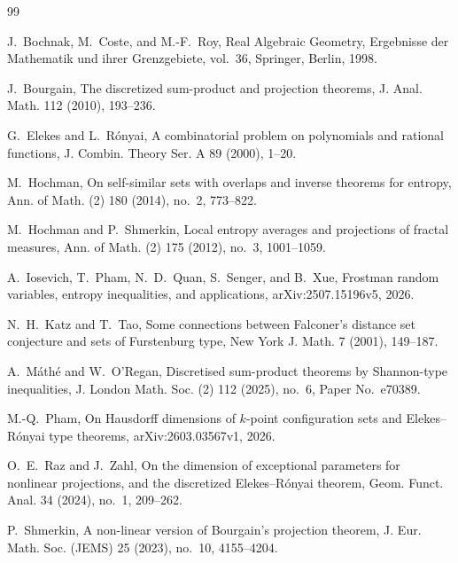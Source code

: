\documentclass[11pt]{article}
\begin{document}
\begin{thebibliography}{99}

J.~Bochnak, M.~Coste, and M.-F.~Roy,
Real Algebraic Geometry,
Ergebnisse der Mathematik und ihrer Grenzgebiete, vol.~36,
Springer, Berlin, 1998.

{
J.~Bourgain,
The discretized sum-product and projection theorems,
J. Anal. Math. 112 (2010), 193--236.}

G.~Elekes and L.~R\'onyai,
A combinatorial problem on polynomials and rational functions,
J. Combin. Theory Ser. A 89 (2000), 1--20.

{
M.~Hochman,
On self-similar sets with overlaps and inverse theorems for
entropy,
Ann. of Math. (2) 180 (2014), no.~2, 773--822.}

{
M.~Hochman and P.~Shmerkin,
Local entropy averages and projections of fractal measures,
Ann. of Math. (2) 175 (2012), no.~3, 1001--1059.}

A.~Iosevich, T.~Pham, N.~D.~Quan, S.~Senger, and B.~Xue,
Frostman random variables, entropy inequalities, and applications,
arXiv:2507.15196v5, 2026.

{
N.~H.~Katz and T.~Tao,
Some connections between Falconer's distance set conjecture and
sets of Furstenburg type,
New York J. Math. 7 (2001), 149--187.}

{
A.~M\'ath\'e and W.~O'Regan,
Discretised sum-product theorems by Shannon-type inequalities,
J. London Math. Soc. (2) 112 (2025), no.~6,
Paper No.~e70389.}

M.-Q.~Pham,
On Hausdorff dimensions of $k$-point configuration sets and
Elekes--R\'onyai type theorems,
arXiv:2603.03567v1, 2026.

O.~E.~Raz and J.~Zahl,
On the dimension of exceptional parameters for nonlinear
projections, and the discretized Elekes--R\'onyai theorem,
Geom. Funct. Anal. 34 (2024), no.~1, 209--262.

{
P.~Shmerkin,
A non-linear version of Bourgain's projection theorem,
J. Eur. Math. Soc. (JEMS) 25 (2023), no.~10, 4155--4204.}

\end{thebibliography}
\end{document}
